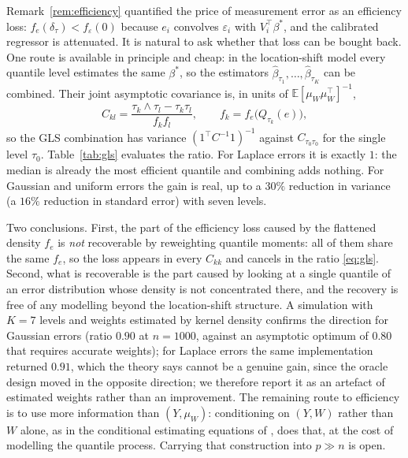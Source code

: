 \documentclass[12pt,a4paper]{article}
\theoremstyle{definition}
\theoremstyle{remark}
\newcommand{\E}{\mathbb{E}}
\newcommand{\betas}{\beta^*}
\newcommand{\muv}{\mu_W}
\begin{document}
Remark~\ref{rem:efficiency} quantified the price of measurement error as
an efficiency loss: $f_e(\delta_\tau)<f_\varepsilon(0)$ because $e_i$ convolves
$\varepsilon_i$ with $V_i^\top\betas$, and the calibrated regressor is attenuated. It is
natural to ask whether that loss can be bought back. One route is available in principle
and cheap: in the location-shift model every quantile level estimates the same $\betas$, so
the estimators $\hat\beta_{\tau_1},\dots,\hat\beta_{\tau_K}$ can be combined. Their joint
asymptotic covariance is, in units of $\E[\muv\muv^\top]^{-1}$,
\begin{equation}
C_{kl} = \frac{\tau_k\wedge\tau_l-\tau_k\tau_l}{f_kf_l},
\qquad f_k = f_e\big(Q_{\tau_k}(e)\big),
\label{eq:gls}
\end{equation}
so the GLS combination has variance $(1^\top C^{-1}1)^{-1}$ against $C_{\tau_0\tau_0}$ for
the single level $\tau_0$. Table~\ref{tab:gls} evaluates the ratio. For Laplace errors it
is exactly $1$: the median is already the most efficient quantile and combining adds
nothing. For Gaussian and uniform errors the gain is real, up to a $30\%$ reduction in
variance (a $16\%$ reduction in standard error) with seven levels.



Two conclusions. First, the part of the efficiency loss caused by the flattened density
$f_e$ is \emph{not} recoverable by reweighting quantile moments: all of them share the same
$f_e$, so the loss appears in every $C_{kk}$ and cancels in the ratio
\eqref{eq:gls}. Second, what is recoverable is the part caused by looking at a single
quantile of an error distribution whose density is not concentrated there, and the
recovery is free of any modelling beyond the location-shift structure. A simulation with
$K=7$ levels and weights estimated by kernel density confirms the direction for Gaussian
errors (ratio $0.90$ at $n=1000$, against an asymptotic optimum of $0.80$ that requires
accurate weights); for Laplace errors the same implementation returned $0.91$, which the
theory says cannot be a genuine gain, since the oracle design moved in the opposite
direction; we therefore report it as an artefact of estimated weights rather than an
improvement. The remaining route to efficiency is to use more information than
$(Y,\muv)$: conditioning on $(Y,W)$ rather than $W$ alone, as in the conditional
estimating equations of \citet{wei2009quantile}, does that, at the cost of
modelling the quantile process. Carrying that construction into $p\gg n$ is open.
\end{document}
